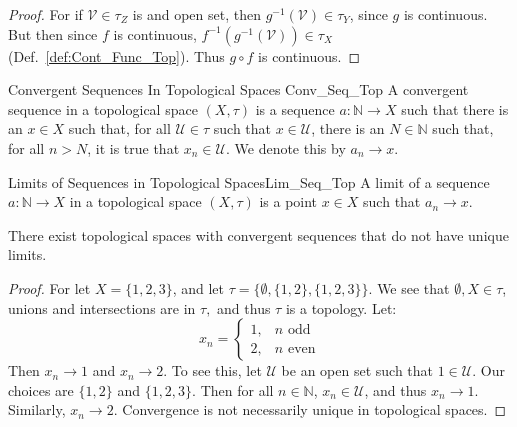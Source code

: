     \begin{proof}
        For if $\mathcal{V}\in\tau_{Z}$ is and open set, then
        $g^{\minus{1}}(\mathcal{V})\in\tau_{Y}$, since $g$ is continuous. But
        then since $f$ is continuous,
        $f^{\minus{1}}(g^{\minus{1}}(\mathcal{V}))\in\tau_{X}$
        (Def.~\ref{def:Cont_Func_Top}). Thus $g\circ{f}$ is continuous.
    \end{proof}
    \begin{ldefinition}{Convergent Sequences In Topological Spaces}
                       {Conv_Seq_Top}
        A convergent sequence in a topological space $(X,\tau)$ is a sequence
        $a:\mathbb{N}\rightarrow{X}$ such that there is an $x\in{X}$ such that,
        for all $\mathcal{U}\in\tau$ such that $x\in\mathcal{U}$, there is an
        $N\in\mathbb{N}$ such that, for all $n>N$, it is true that
        $x_{n}\in\mathcal{U}$. We denote this by $a_{n}\rightarrow{x}$.
    \end{ldefinition}
    \begin{ldefinition}{Limits of Sequences in Topological Spaces}{Lim_Seq_Top}
        A limit of a sequence $a:\mathbb{N}\rightarrow{X}$ in a topological
        space $(X,\tau)$ is a point $x\in{X}$ such that $a_{n}\rightarrow{x}$.
    \end{ldefinition}
    \begin{theorem}
        There exist topological spaces with convergent sequences that do not
        have unique limits.
    \end{theorem}
    \begin{proof}
        For let $X=\{1,2,3\}$, and let $\tau=\{\emptyset, \{1,2\},\{1,2,3\}\}$.
        We see that $\emptyset,X\in \tau$, unions and intersections are in
        $\tau,$ and thus $\tau$ is a topology. Let:
        \begin{equation}
            x_{n}=
            \begin{cases}
                1,&n\textrm{ odd}\\
                2,&n\textrm{ even}
            \end{cases}
        \end{equation}
        Then $x_n \rightarrow 1$ and $x_n \rightarrow 2$. To see this, let
        $\mathcal{U}$ be an open set such that $1\in \mathcal{U}$. Our choices
        are $\{1,2\}$ and $\{1,2,3\}$. Then for all $n\in \mathbb{N}$,
        $x_{n}\in\mathcal{U}$, and thus $x_{n}\rightarrow{1}$. Similarly,
        $x_n \rightarrow 2$. Convergence is not necessarily unique in
        topological spaces.
    \end{proof}
